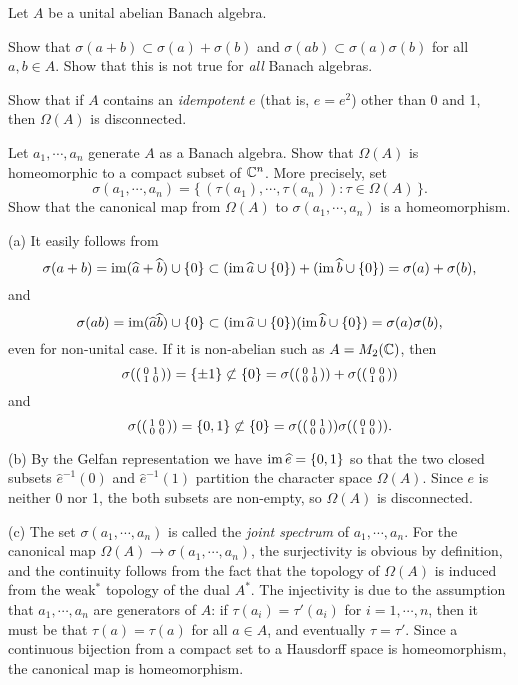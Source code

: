 \documentclass{../solution}
\begin{document}
\begin{prb}
Let $A$ be a unital abelian Banach algebra.
\begin{parts}
\item
Show that $\sigma(a+b)\subset\sigma(a)+\sigma(b)$ and $\sigma(ab)\subset\sigma(a)\sigma(b)$ for all $a,b\in A$.
Show that this is not true for \emph{all} Banach algebras.
\item
Show that if $A$ contains an \emph{idempotent} $e$ (that is, $e=e^2$) other than 0 and 1, then $\Omega(A)$ is disconnected.
\item
Let $a_1,\cdots,a_n$ generate $A$ as a Banach algebra.
Show that $\Omega(A)$ is homeomorphic to a compact subset of $\C^n$.
More precisely, set
\[\sigma(a_1,\cdots,a_n)=\{\,(\tau(a_1),\cdots,\tau(a_n)):\tau\in\Omega(A)\,\}.\]
Show that the canonical map from $\Omega(A)$ to $\sigma(a_1,\cdots,a_n)$ is a homeomorphism.
\end{parts}
\end{prb}
\begin{sol}
(a)
It easily follows from
\[\sigma(a+b)=\im(\hat a+\hat b)\cup\{0\}\subset(\im\hat a\cup\{0\})+(\im\hat b\cup\{0\})=\sigma(a)+\sigma(b),\]
and
\[\sigma(ab)=\im(\hat a\hat b)\cup\{0\}\subset(\im\hat a\cup\{0\})(\im\hat b\cup\{0\})=\sigma(a)\sigma(b),\]
even for non-unital case.
If it is non-abelian such as $A=M_2(\C)$, then
\[\sigma((\mat[small]{0&1\\1&0}))=\{\pm1\}\not\subset\{0\}=\sigma((\mat[small]{0&1\\0&0}))+\sigma((\mat[small]{0&0\\1&0}))\]
and
\[\sigma((\mat[small]{1&0\\0&0}))=\{0,1\}\not\subset\{0\}=\sigma((\mat[small]{0&1\\0&0}))\sigma((\mat[small]{0&0\\1&0})).\]

(b)
By the Gelfan representation we have $\im\hat e=\{0,1\}$ so that the two closed subsets $\hat e^{-1}(0)$ and $\hat e^{-1}(1)$ partition the character space $\Omega(A)$.
Since $e$ is neither 0 nor 1, the both subsets are non-empty, so $\Omega(A)$ is disconnected.

(c)
The set $\sigma(a_1,\cdots,a_n)$ is called the \emph{joint spectrum} of $a_1,\cdots,a_n$.
For the canonical map $\Omega(A)\to\sigma(a_1,\cdots,a_n)$, the surjectivity is obvious by definition, and the continuity follows from the fact that the topology of $\Omega(A)$ is induced from the weak$^*$ topology of the dual $A^*$.
The injectivity is due to the assumption that $a_1,\cdots,a_n$ are generators of $A$: if $\tau(a_i)=\tau'(a_i)$ for $i=1,\cdots,n$, then it must be that $\tau(a)=\tau(a)$ for all $a\in A$, and eventually $\tau=\tau'$.
Since a continuous bijection from a compact set to a Hausdorff space is homeomorphism, the canonical map is homeomorphism.
\end{sol}
\end{document}

